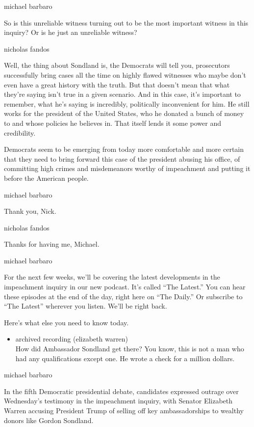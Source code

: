 michael barbaro

So is this unreliable witness turning out to be the most important
witness in this inquiry? Or is he just an unreliable witness?

nicholas fandos

Well, the thing about Sondland is, the Democrats will tell you,
prosecutors successfully bring cases all the time on highly flawed
witnesses who maybe don't even have a great history with the truth. But
that doesn't mean that what they're saying isn't true in a given
scenario. And in this case, it's important to remember, what he's saying
is incredibly, politically inconvenient for him. He still works for the
president of the United States, who he donated a bunch of money to and
whose policies he believes in. That itself lends it some power and
credibility.

Democrats seem to be emerging from today more comfortable and more
certain that they need to bring forward this case of the president
abusing his office, of committing high crimes and misdemeanors worthy of
impeachment and putting it before the American people.

michael barbaro

Thank you, Nick.

nicholas fandos

Thanks for having me, Michael.

michael barbaro

For the next few weeks, we'll be covering the latest developments in the
impeachment inquiry in our new podcast. It's called ``The Latest.'' You
can hear these episodes at the end of the day, right here on ``The
Daily.'' Or subscribe to ``The Latest'' wherever you listen. We'll be
right back.

Here's what else you need to know today.

\begin{itemize}
\tightlist
\item
  archived recording (elizabeth warren)\\
  How did Ambassador Sondland get there? You know, this is not a man who
  had any qualifications except one. He wrote a check for a million
  dollars.
\end{itemize}

michael barbaro

In the fifth Democratic presidential debate, candidates expressed
outrage over Wednesday's testimony in the impeachment inquiry, with
Senator Elizabeth Warren accusing President Trump of selling off key
ambassadorships to wealthy donors like Gordon Sondland.

